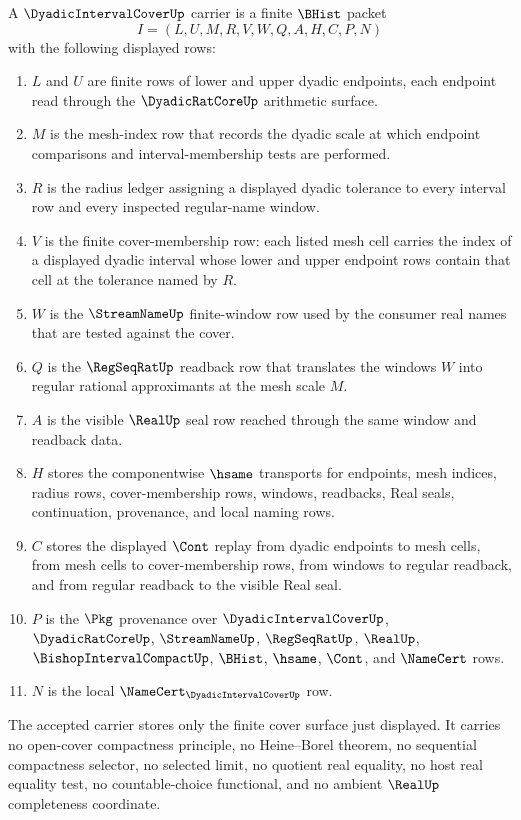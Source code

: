 \begin{definition}
\label{def:dyadic-interval-cover-carrier}
A $\DyadicIntervalCoverUp$ carrier is a finite $\BHist$ packet
$$
I=(L,U,M,R,V,W,Q,A,H,C,P,N)
$$
with the following displayed rows:
\begin{enumerate}
\item $L$ and $U$ are finite rows of lower and upper dyadic endpoints, each endpoint read through the $\DyadicRatCoreUp$ arithmetic surface.
\item $M$ is the mesh-index row that records the dyadic scale at which endpoint comparisons and interval-membership tests are performed.
\item $R$ is the radius ledger assigning a displayed dyadic tolerance to every interval row and every inspected regular-name window.
\item $V$ is the finite cover-membership row: each listed mesh cell carries the index of a displayed dyadic interval whose lower and upper endpoint rows contain that cell at the tolerance named by $R$.
\item $W$ is the $\StreamNameUp$ finite-window row used by the consumer real names that are tested against the cover.
\item $Q$ is the $\RegSeqRatUp$ readback row that translates the windows $W$ into regular rational approximants at the mesh scale $M$.
\item $A$ is the visible $\RealUp$ seal row reached through the same window and readback data.
\item $H$ stores the componentwise $\hsame$ transports for endpoints, mesh indices, radius rows, cover-membership rows, windows, readbacks, Real seals, continuation, provenance, and local naming rows.
\item $C$ stores the displayed $\Cont$ replay from dyadic endpoints to mesh cells, from mesh cells to cover-membership rows, from windows to regular readback, and from regular readback to the visible Real seal.
\item $P$ is the $\Pkg$ provenance over $\DyadicIntervalCoverUp$, $\DyadicRatCoreUp$, $\StreamNameUp$, $\RegSeqRatUp$, $\RealUp$, $\BishopIntervalCompactUp$, $\BHist$, $\hsame$, $\Cont$, and $\NameCert$ rows.
\item $N$ is the local $\NameCert_{\DyadicIntervalCoverUp}$ row.
\end{enumerate}
The accepted carrier stores only the finite cover surface just displayed. It carries no open-cover compactness principle, no Heine--Borel theorem, no sequential compactness selector, no selected limit, no quotient real equality, no host real equality test, no countable-choice functional, and no ambient $\RealUp$ completeness coordinate.
\end{definition}

